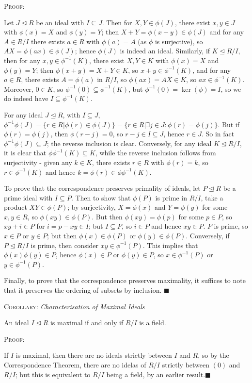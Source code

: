 \documentclass[12pt,a4paper]{article}
\newcommand{\proof}{\noindent\textsc{\large Proof:}\par}
\newcommand{\corol}[1]{\noindent\textsc{\large Corollary:}  \textit{\large #1}\par}
\newcommand{\qed}{\hfill$\blacksquare$\gap}
\newcommand{\gap}{\par \vspace{5mm}}
\let\ideal\trianglelefteq
\begin{document}
\proof
Let $J\ideal R$ be an ideal with $I\subseteq J$. Then for $X,Y\in \phi(J)$, there exist $x,y\in J$ with $\phi(x)=X$ and $\phi(y)=Y$; then $X+Y=\phi(x+y)\in \phi(J)$ and for any $A\in R/I$ there exists $a\in R$ with $\phi(a)=A$ (as $\phi$ is surjective), so $AX=\phi(ax)\in\phi(J)$; hence $\phi(J)$ is indeed an ideal. Similarly, if $K\ideal R/I$, then for any $x,y\in \phi^{-1}(K)$, there exist $X,Y\in K$ with $\phi(x)=X$ and $\phi(y)=Y$; then $\phi(x+y)=X+Y\in K$, so $x+y\in \phi^{-1}(K)$, and for any $a\in R$, there exists $A=\phi(a)$ in $R/I$, so $\phi(ax)=AX\in K$, so $ax\in\phi^{-1}(K)$. Moreover, $0\in K$, so $\phi^{-1}(0)\subseteq\phi^{-1}(K)$, but $\phi^{-1}(0)=\ker(\phi)=I$, so we do indeed have $I\subseteq\phi^{-1}(K)$.

For any ideal $J\ideal R$, with $I\subseteq J$, $\phi^{-1}\phi(J)=\{r\in R | \phi(r)\in \phi(J)\}=\{r\in R|\exists j\in J : \phi(r)=\phi(j)\}$. But if $\phi(r)=\phi(j)$, then $\phi(r-j)=0$, so $r-j\in I\subseteq J$, hence $r\in J$. So in fact $\phi^{-1}\phi(J)\subseteq J$; the reverse inclusion is clear. Conversely, for any ideal $K\ideal R/I$, it is clear that $\phi\phi^{-1}(K)\subseteq K$, while the reverse inclusion follows from surjectivity - given any $k\in K$, there exists $r\in R$ with $\phi(r)=k$, so $r\in \phi^{-1}(K)$ and hence $k=\phi(r)\in \phi\phi^{-1}(K)$.

To prove that the correspondence preserves primality of ideals, let $P\ideal R$ be a prime ideal with $I\subseteq P$. Then to show that $\phi(P)$ is prime in $R/I$, take a product $XY\in \phi(P)$; by surjectivity, $X=\phi(x)$ and $Y=\phi(y)$ for some $x,y\in R$, so $\phi(xy)\in\phi(P)$. But then $\phi(xy)=\phi(p)$ for some $p\in P$, so $xy+i\in P$ for $i=p-xy\in I$; but $I\subseteq P$, so $i\in P$ and hence $xy\in P$. $P$ is prime, so $x\in P$ or $y\in P$; but then $\phi(x)\in\phi(P)$ or $\phi(y)\in \phi(P)$. Conversely, if $P\ideal R/I$ is prime, then consider $xy\in\phi^{-1}(P)$. This implies that $\phi(x)\phi(y)\in P$, hence $\phi(x)\in P$ or $\phi(y)\in P$, so $x\in\phi^{-1}(P)$ or $y\in \phi^{-1}(P)$.

Finally, to prove that the correspondence preserves maximality, it suffices to note that it preserves the ordering of subsets by inclusion. \qed

\corol{Characterisation of Maximal Ideals}
An ideal $I\ideal R$ is maximal if and only if $R/I$ is a field.\gap

\proof
If $I$ is maximal, then there are no ideals strictly between $I$ and $R$, so by the Correspondence Theorem, there are no idelas of $R/I$ strictly between $(0)$ and $R/I$; but this is equivalent to $R/I$ being a field, by an earlier result.\qed
\end{document}
